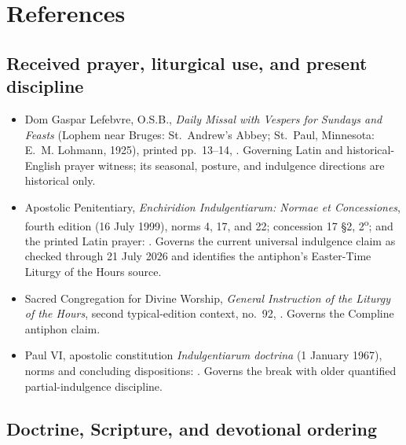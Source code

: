 \section{References}

\subsection{Received prayer, liturgical use, and present discipline}

\begin{itemize}
  \item Dom Gaspar Lefebvre, O.S.B., \textit{Daily Missal with Vespers for Sundays and Feasts} (Lophem near Bruges: St.~Andrew's Abbey; St.~Paul, Minnesota: E.~M. Lohmann, 1925), printed pp.~13--14, . Governing Latin and historical-English prayer witness; its seasonal, posture, and indulgence directions are historical only.
  \item Apostolic Penitentiary, \textit{Enchiridion Indulgentiarum: Normae et Concessiones}, fourth edition (16 July 1999), norms 4, 17, and 22; concession 17 \S2, 2\textsuperscript{o}; and the printed Latin prayer: . Governs the current universal indulgence claim as checked through 21 July 2026 and identifies the antiphon's Easter-Time Liturgy of the Hours source.
  \item Sacred Congregation for Divine Worship, \textit{General Instruction of the Liturgy of the Hours}, second typical-edition context, no.~92, . Governs the Compline antiphon claim.
  \item Paul VI, apostolic constitution \textit{Indulgentiarum doctrina} (1 January 1967), norms and concluding dispositions: . Governs the break with older quantified partial-indulgence discipline.
\end{itemize}

\subsection{Doctrine, Scripture, and devotional ordering}

